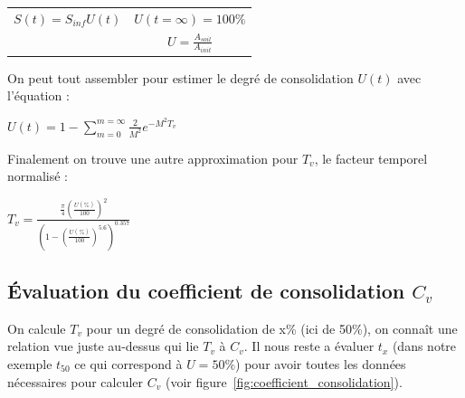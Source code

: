\medskip
\begin{center}
\begin{tabular}{c|c}
    $S(t) = S_{inf} U(t) $ \quad &   $ U(t=\infty) =100\% $  \\
     &  $ U = \frac{A_{soil}}{A_{init}} $ 
\end{tabular}
\end{center}
\medskip 

On peut tout assembler pour estimer le degré de consolidation $U(t)$ avec l'équation : 

\medskip
\begin{center}
$ U(t) = 1 - \sum_{m = 0}^{m = \infty} \frac{2}{M^2} e^{-M^2T_v} $
\end{center}
\medskip

Finalement on trouve une autre approximation pour $T_v$, le facteur temporel normalisé :

\medskip 
\begin{center}
    $ T_v = \frac{\frac{\pi}{4} (\frac{U(\%)}{100})^2}{(1-(\frac{U(\%)}{100})^{5.6})^{0.357}} $
\end{center}
\subsection{Évaluation du coefficient de consolidation $C_v$}

    On calcule $T_v$ pour un degré de consolidation de x\% (ici de 50\%), on connaît une relation vue juste au-dessus qui lie $T_v$ à $C_v$. Il nous reste a évaluer $t_x$ (dans notre exemple $t_{50}$ ce qui correspond à $ U = 50\% $) pour avoir toutes les données nécessaires pour calculer $C_v$ (voir figure~\ref{fig:coefficient_consolidation}).
    
